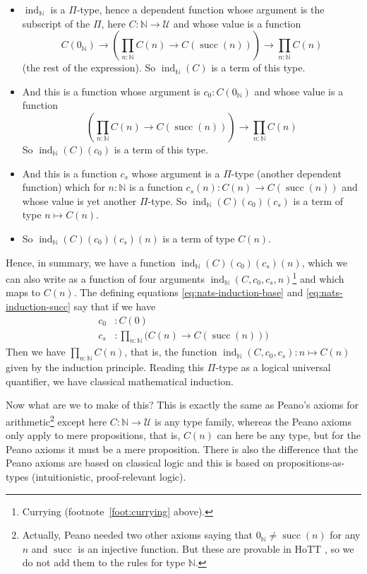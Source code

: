 \documentclass[11pt]{article}
\DeclareMathOperator{\successor}{succ}
\DeclareMathOperator{\inductor}{ind}
\newcommand{\nats}{\mathbb{N}}
\newcommand{\universe}{\mathcal{U}}
\begin{document}
\begin{itemize}
\item $\inductor_\nats$ is a $\Pi$-type,
    hence a dependent function whose argument is the subscript
    of the $\Pi$, here $C : \nats \to \universe$ and whose value is a function
$$
   C(0_\nats) \to \left( \prod_{n : \nats} C(n) \to C(\successor(n)) \right)
   \to \prod_{n : \nats} C(n)
$$
   (the rest of the expression).
   So $\inductor_\nats(C)$ is a term of this type.
\item And this is a function whose argument is $c_0 : C(0_\nats)$ and
    whose value is a function
$$
   \left( \prod_{n : \nats} C(n) \to C(\successor(n)) \right)
   \to \prod_{n : \nats} C(n)
$$
    So $\inductor_\nats(C)(c_0)$ is a term of this type.
\item And this is a function $c_s$ whose argument is a $\Pi$-type
    (another dependent function) which for $n : \nats$ is a function
    $c_s(n) : C(n) \to C(\successor(n))$ and whose value is yet another
    $\Pi$-type.  So $\inductor_\nats(C)(c_0)(c_s)$ is a term of type
    $n \mapsto C(n)$.
\item
    So $\inductor_\nats(C)(c_0)(c_s)(n)$ is a term of type $C(n)$.
\end{itemize}
Hence, in summary, we have a function $\inductor_\nats(C)(c_0)(c_s)(n)$,
which we can also
write as a function of four arguments
$\inductor_\nats(C, c_0, c_s, n)$\footnote{Currying
(footnote~\ref{foot:currying} above).} and which maps to $C(n)$.
The defining equations \eqref{eq:nats-induction-base} and
\eqref{eq:nats-induction-succ} say that if we have
\begin{align*}
   c_0 & : C(0)
   \\
   c_s & : \prod_{n : \nats} \bigl( C(n) \to C(\successor(n)) \bigr)
\end{align*}
Then we have $\prod_{n : \nats} C(n)$, that is, the function
$\inductor_\nats(C, c_0, c_s) : n \mapsto C(n)$
given by the induction principle.
Reading this $\Pi$-type as a logical universal quantifier,
we have classical mathematical induction.

Now what are we to make of this?  This is exactly the same as
Peano's axioms for arithmetic\footnote{Actually, Peano needed two other
axioms saying that $0_\nats \neq \successor(n)$ for any $n$
and $\successor$ is an injective function.
But these are provable in HoTT
, so we do not add them to the rules
for type $\nats$.}
except here $C : \nats \to \universe$
is any type family, whereas the Peano axioms only apply to mere propositions,
that is, $C(n)$ can here be any type, but for the Peano axioms it must be
a mere proposition.  There is also the difference that the Peano axioms
are based on classical logic and this is based on propositions-as-types
(intuitionistic, proof-relevant logic).
\end{document}
